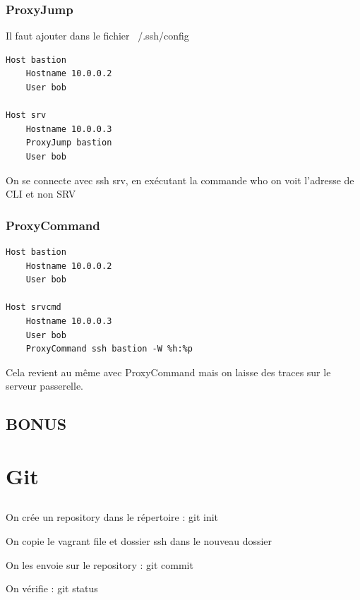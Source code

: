 \documentclass{article}
\begin{document}
\subsubsection{ProxyJump}

\noindent Il faut ajouter dans le fichier ~/.ssh/config

\begin{commandline}
	\begin{verbatim}
Host bastion
    Hostname 10.0.0.2
    User bob

Host srv
    Hostname 10.0.0.3
    ProxyJump bastion
    User bob
	\end{verbatim}
\end{commandline}
\noindent On se connecte avec ssh srv, en exécutant la commande who on voit l'adresse de CLI et non SRV

\subsubsection{ProxyCommand}

\begin{commandline}
	\begin{verbatim}
Host bastion
    Hostname 10.0.0.2
    User bob

Host srvcmd
    Hostname 10.0.0.3
    User bob
    ProxyCommand ssh bastion -W %h:%p
	\end{verbatim}
\end{commandline}

\noindent Cela revient au même avec ProxyCommand mais on laisse des traces sur le serveur passerelle.

\subsection{BONUS}

\section{Git}

\subsection{}
On crée un repository dans le répertoire : git init

On copie le vagrant file et dossier ssh dans le nouveau dossier

On les envoie sur le repository : git commit

On vérifie : git status
\end{document}
